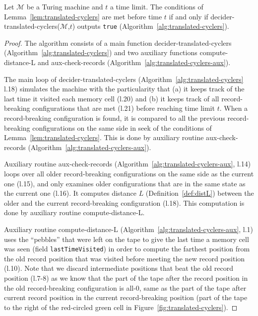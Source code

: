 \begin{theorem}\label{th:translated-cyclers}
  Let $\mathcal{M}$ be a Turing machine and $t$ a time limit. The conditions of Lemma~\ref{lem:translated-cyclers} are met before time $t$ if and only if {\sc decider-translated-cyclers}($\mathcal{M}$,$t$) outputs \texttt{true} (Algorithm~\ref{alg:translated-cyclers}).
\end{theorem}
\begin{proof}
  The algorithm consists of a main function {\sc decider-translated-cyclers} (Algorithm~\ref{alg:translated-cyclers}) and two auxiliary functions {\sc compute-distance-L} and {\sc aux-check-records} (Algorithm~\ref{alg:translated-cyclers-aux}).

  The main loop of {\sc decider-translated-cyclers} (Algorithm~\ref{alg:translated-cyclers} l.18) simulates the machine with the particularity that (a) it keeps track of the last time it visited each memory cell (l.20) and (b) it keeps track of all record-breaking configurations that are met (l.21) before reaching time limit $t$. When a record-breaking configuration is found, it is compared to all the previous record-breaking configurations on the same side in seek of the conditions of Lemma~\ref{lem:translated-cyclers}. This is done by auxiliary routine {\sc aux-check-records} (Algorithm~\ref{alg:translated-cyclers-aux}).

  Auxiliary routine {\sc aux-check-records} (Algorithm~\ref{alg:translated-cyclers-aux}, l.14) loops over all older record-breaking configurations on the same side as the current one (l.15), and only examines older configurations that are in the same state as the current one (l.16). It computes distance $L$ (Definition~\ref{def:distL}) between the older and the current record-breaking configuration (l.18). This computation is done by auxiliary routine {\sc compute-distance-L}.

  Auxiliary routine {\sc compute-distance-L} (Algorithm~\ref{alg:translated-cyclers-aux}, l.1) uses the ``pebbles'' that were left on the tape to give the last time a memory cell was seen (field \texttt{lastTimeVisited}) in order to compute the farthest position from the old record position that was visited before meeting the new record position (l.10). Note that we discard intermediate positions that beat the old record position (l.7-8) as we know that the part of the tape after the record position in the old record-breaking configuration is all-0, same as the part of the tape after current record position in the current record-breaking position (part of the tape to the right of the red-circled green cell in Figure~\ref{fig:translated-cyclers}).


\end{proof}
